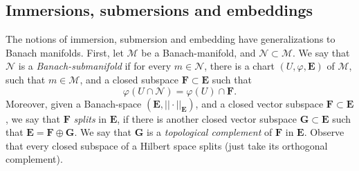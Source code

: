 
\subsection{Immersions, submersions and embeddings}
The notions of immersion, submersion and embedding have generalizations to Banach manifolds. First, let \(\mathcal{M}\) be a Banach-manifold, and \(\mathcal{N} \subset \mathcal{M}\). We say that \(\mathcal{N}\) is a \textit{Banach-submanifold} if for every \(m \in \mathcal{N}\), there is a chart \((U, \varphi, \mathbf{E})\) of \(\mathcal{M}\), such that \(m \in \mathcal{M}\), and a closed subspace \(\mathbf{F} \subset \mathbf{E}\) such that 
\[
\varphi(U \cap \mathcal{N})=\varphi(U) \cap \mathbf{F}.
\]
Moreover, given a Banach-space \((\mathbf{E}, ||\cdot ||_{\mathbf{E}})\), and a closed vector subspace \(\mathbf{F} \subset \mathbf{E}\), we say that \(\mathbf{F}\) \textit{splits} in \(\mathbf{E}\), if there is another closed vector subspace \(\mathbf{G}\subset \mathbf{E}\) such that \(\mathbf{E}=\mathbf{F}\oplus \mathbf{G}\). We say that \(\mathbf{G}\) is a \textit{topological complement} of \(\mathbf{F}\) in \(\mathbf{E}\). Observe that every closed subspace of a Hilbert space splits (just take its orthogonal complement).

